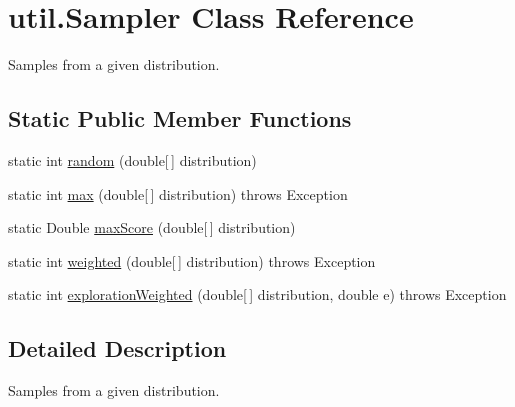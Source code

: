 \hypertarget{classutil_1_1_sampler}{
\section{util.Sampler Class Reference}
\label{classutil_1_1_sampler}
}


Samples from a given distribution.  


\subsection*{Static Public Member Functions}
\begin{DoxyCompactItemize}
\item 
static int \hyperlink{classutil_1_1_sampler_a4e2ee0c6fb2b3d0b4a00b343d7b7abd7}{random} (double\mbox{[}$\,$\mbox{]} distribution)
\item 
static int \hyperlink{classutil_1_1_sampler_afe0711daf9addcddd966d27c76d870f2}{max} (double\mbox{[}$\,$\mbox{]} distribution)  throws Exception 
\item 
static Double \hyperlink{classutil_1_1_sampler_acdd822b847f093367a86856c14a3f33b}{maxScore} (double\mbox{[}$\,$\mbox{]} distribution)
\item 
static int \hyperlink{classutil_1_1_sampler_afad8757ed1399647aade410b6ad56b52}{weighted} (double\mbox{[}$\,$\mbox{]} distribution)  throws Exception 
\item 
static int \hyperlink{classutil_1_1_sampler_a38f40f85cf9153da04179721ecd1eb10}{explorationWeighted} (double\mbox{[}$\,$\mbox{]} distribution, double e)  throws Exception 
\end{DoxyCompactItemize}


\subsection{Detailed Description}
Samples from a given distribution. 

